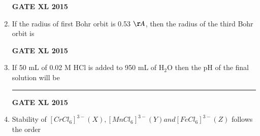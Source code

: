 \documentclass[journal,12pt,onecolumn]{IEEEtran}
\begin{document}
\begin{enumerate}
\begin{flushright}\textbf{GATE XL 2015}\end{flushright}
\item If the radius of first Bohr orbit is 0.53 $\AA$, then the radius of the third Bohr orbit is
    \begin{enumerate}
    \end{enumerate}
\begin{flushright}\textbf{GATE XL 2015}\end{flushright}
\item If 50 mL of 0.02 M HCl is added to 950 mL of H$_2$O then the pH of the final solution will be \rule{1cm}{0.15mm}
\begin{flushright}\textbf{GATE XL 2015}\end{flushright}
\item Stability of $[CrCl_6 ]^{3-} (X), [MnCl_6 ]^{3-} (Y) and [FeCl_6 ]^{3-} (Z)$ follows the order


\end{enumerate}
\end{document}
